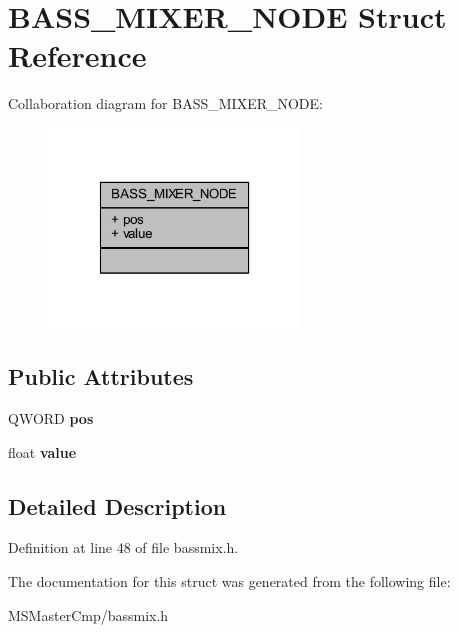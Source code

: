 \hypertarget{struct_b_a_s_s___m_i_x_e_r___n_o_d_e}{\section{B\-A\-S\-S\-\_\-\-M\-I\-X\-E\-R\-\_\-\-N\-O\-D\-E Struct Reference}
\label{struct_b_a_s_s___m_i_x_e_r___n_o_d_e}
}


Collaboration diagram for B\-A\-S\-S\-\_\-\-M\-I\-X\-E\-R\-\_\-\-N\-O\-D\-E\-:\nopagebreak
\begin{figure}[H]
\begin{center}
\leavevmode
\includegraphics[width=190pt]{struct_b_a_s_s___m_i_x_e_r___n_o_d_e__coll__graph}
\end{center}
\end{figure}
\subsection*{Public Attributes}
\begin{DoxyCompactItemize}
\item 
\hypertarget{struct_b_a_s_s___m_i_x_e_r___n_o_d_e_af4010e38e85d9f9ddadfdd18bd60f7b5_af4010e38e85d9f9ddadfdd18bd60f7b5}{Q\-W\-O\-R\-D {\bfseries pos}}\label{struct_b_a_s_s___m_i_x_e_r___n_o_d_e_af4010e38e85d9f9ddadfdd18bd60f7b5_af4010e38e85d9f9ddadfdd18bd60f7b5}

\item 
\hypertarget{struct_b_a_s_s___m_i_x_e_r___n_o_d_e_a545b3a15ac920fa4a6a63059c5387cc4_a545b3a15ac920fa4a6a63059c5387cc4}{float {\bfseries value}}\label{struct_b_a_s_s___m_i_x_e_r___n_o_d_e_a545b3a15ac920fa4a6a63059c5387cc4_a545b3a15ac920fa4a6a63059c5387cc4}

\end{DoxyCompactItemize}


\subsection{Detailed Description}


Definition at line 48 of file bassmix.\-h.



The documentation for this struct was generated from the following file\-:\begin{DoxyCompactItemize}
\item 
M\-S\-Master\-Cmp/bassmix.\-h\end{DoxyCompactItemize}
